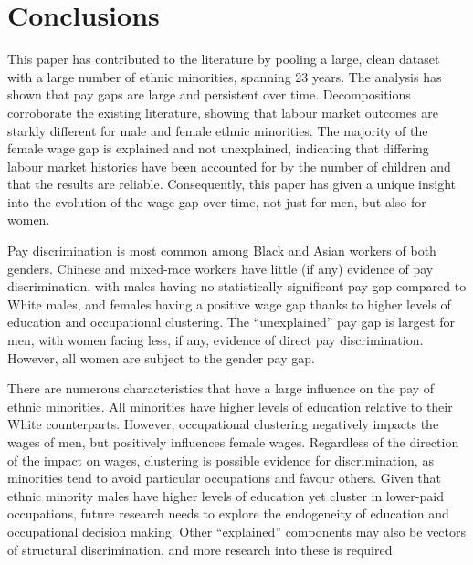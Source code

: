 \documentclass[class=article, crop=false]{standalone}
\begin{document}
\section{Conclusions}
\label{sec:Conclusions}
This paper has contributed to the literature by pooling a large, clean dataset with a large number of ethnic minorities, spanning 23 years. The analysis has shown that pay gaps are large and persistent over time. Decompositions corroborate the existing literature, showing that labour market outcomes are starkly different for male and female ethnic minorities. The majority of the female wage gap is explained and not unexplained, indicating that differing labour market histories have been accounted for by the number of children and that the results are reliable. Consequently, this paper has given a unique insight into the evolution of the wage gap over time, not just for men, but also for women. %

Pay discrimination is most common among Black and Asian workers of both genders. Chinese and mixed-race workers have little (if any) evidence of pay discrimination, with males having no statistically significant pay gap compared to White males, and females having a positive wage gap thanks to higher levels of education and occupational clustering. The \enquote{unexplained} pay gap is largest for men, with women facing less, if any, evidence of direct pay discrimination. However, all women are subject to the gender pay gap.

There are numerous characteristics that have a large influence on the pay of ethnic minorities. All minorities have higher levels of education relative to their White counterparts. However, occupational clustering negatively impacts the wages of men, but positively influences female wages. Regardless of the direction of the impact on wages, clustering is possible evidence for discrimination, as minorities tend to avoid particular occupations and favour others. Given that ethnic minority males have higher levels of education yet cluster in lower-paid occupations, future research needs to explore the endogeneity of education and occupational decision making. Other \enquote{explained} components may also be vectors of structural discrimination, and more research into these is required.
\end{document}
